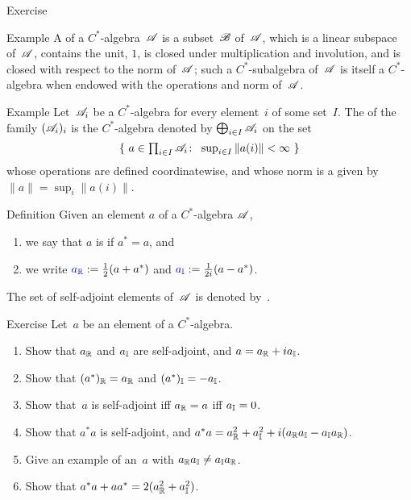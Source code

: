 \documentclass[main]{subfiles}
\begin{document}
\begin{parsec}
\begin{point}{Exercise}
\begin{point}{Example}
A 
of a $C^*$-algebra~$\mathscr{A}$
is a subset~$\mathscr{B}$ of~$\mathscr{A}$,
which is a linear subspace of~$\mathscr{A}$,
contains the unit, $1$, is closed under multiplication
and involution, 
and is closed with respect to the norm of~$\mathscr{A}$;
such a $C^*$-subalgebra of~$\mathscr{A}$
is itself a $C^*$-algebra
when endowed with the operations and norm
of~$\mathscr{A}$.
\end{point}
\begin{point}{Example}%
Let~$\mathscr{A}_i$ be a $C^*$-algebra
for every element~$i$ of some set~$I$.
The 
of the family $(\mathscr{A}_i)_i$
is the $C^*$-algebra
denoted by $\bigoplus_{i\in I}\mathscr{A}_i$ on the set
\begin{equation*}
\textstyle
\{\  a\in \prod_{i\in I}\mathscr{A}_i\colon\  \sup_{i \in I} \|a(i)\|< \infty \ \}
\end{equation*}
whose operations are defined coordinatewise,
and whose norm is a  given by $\|a\|=\sup_{i}\|a(i)\|$.
\end{point}
\end{point}

\end{parsec}
\begin{parsec}%
\begin{point}{Definition}%
Given an element $a$ of a $C^*$-algebra $\mathscr{A}$, 
\begin{enumerate}
\item we say that $a$ is  if $a^* =a$, and
\item we write $\Define{\Real{a}}:= \frac{1}{2}(a+a^*)$
and $\Define{\Imag{a}}:=\frac{1}{2i}(a-a^*)$.
\end{enumerate}
The set of self-adjoint elements of~$\mathscr{A}$
is denoted by~\Define{$\sa{\scrA}$}.
\end{point}
\begin{point}{Exercise}%
Let~$a$ be an element of a $C^*$-algebra.
\begin{enumerate}
\item 
Show that $a_{\mathbb{R}}$ and $a_{\mathbb{I}}$ are self-adjoint,
and  $a= a_{\mathbb{R}}+ia_{\mathbb{I}}$.
\item
Show that $(a^*)_{\mathbb{R}}=a_{\mathbb{R}}$ and $(a^*)_{\mathbb{I}}=-a_{\mathbb{I}}$.
\item 
Show that~$a$ is self-adjoint iff $a_{\mathbb{R}}=a$ iff $a_{\mathbb{I}}=0$.
\item
Show that $a^*a$ is self-adjoint,
and  $a^*a=a_{\mathbb{R}}^2+a_{\mathbb{I}}^2+i(a_{\mathbb{R}}a_{\mathbb{I}}-a_{\mathbb{I}}a_{\mathbb{R}})$.
\item
Give an example of an~$a$ with  $a_{\mathbb{R}}a_{\mathbb{I}} \neq a_{\mathbb{I}}a_{\mathbb{R}}$.
\item
Show that $a^*a+aa^* = 2(a_{\mathbb{R}}^2+a_{\mathbb{I}}^2)$.
\end{enumerate}
\end{point}
\end{parsec}
\end{document}
